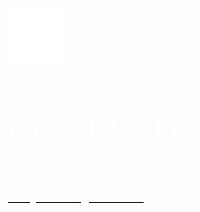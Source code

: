 \documentclass[../main.tex]{subfiles}
\begin{document}
    \hspace*{0.2cm}
    \begin{minipage}[t]{2cm}
        \vspace*{0.75cm}\includegraphics[width=1.5cm]{assets/contact.png}
    \end{minipage}
    \begin{minipage}[t]{5cm}
        \vspace*{0.75cm}

        \section*{\textcolor{white}{CONTACTO}}
        \vspace*{-0.25cm}
        \textcolor{white}{
            +34 660810737 \\
            \underline{\href{mailto:talayaalba@gmail.com}{\textcolor{white}{talayaalba@gmail.com}}}
        }
    \end{minipage}
\end{document}
